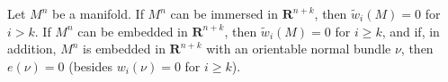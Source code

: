 Let $M^n$ be a manifold. If $M^n$ can be immersed in $\mathbf{R}^{n+k}$, then $\tilde{w}_i(M) = 0$ for $i > k$. If $M^n$ can be embedded in $\mathbf{R}^{n+k}$, then $\tilde{w}_i(M) = 0$ for $i \geq k$, and if, in addition, $M^n$ is embedded in $\mathbf{R}^{n+k}$ with an orientable normal bundle $\nu$, then $e(\nu) = 0$ (besides $w_i(\nu) = 0$ for $i \geq k$).
